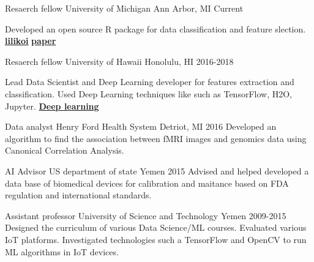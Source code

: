 \begin{cventries}

  \cventry
    {Resaerch fellow}
    {University of Michigan}
    {Ann Arbor, MI}
    {Current}
    {
    
 Developed an open source R package for data classification and feature slection. \href{https://github.com/FADHLyemen/lilikoi_summary}{\textbf{lilikoi}}
 \href{https://academic.oup.com/gigascience/article/7/12/giy136/5237705}{\textbf{paper}}
   
    }

  \cventry
    {Resaerch fellow}
    {University of Hawaii}
    {Honolulu, HI}
    {2016-2018}
    {
     Lead Data Scientist and Deep Learning developer for features extraction and classification. Used
    Deep Learning techniques like such as TensorFlow, H2O, Jupyter.
    \href{ https://www.ncbi.nlm.nih.gov/pubmed/29110491}{\textbf{Deep learning}}
   
    }

  \cventry
    {Data analyst}
    {Henry Ford Health System}
    {Detriot, MI}
    {2016}
    {
      Developed an algorithm to find the association between fMRI images and genomics data using Canonical Correlation Analysis. 
    }

  \cventry
    {AI Advisor}
    {US department of state}
    {Yemen}
    {2015}
    {
    Advised and helped developed a data base of biomedical devices for calibration and maitance based on FDA regulation and international standards.
    }

  \cventry
    {Assistant professor}
    {University of Science and Technology}
    {Yemen}
    {2009-2015}
    {
    Designed the curriculum of various
    Data Science/ML courses. Evaluated various IoT platforms. Investigated
    technologies such a TensorFlow and OpenCV to run ML algorithms in IoT
    devices.
    }


\end{cventries}

